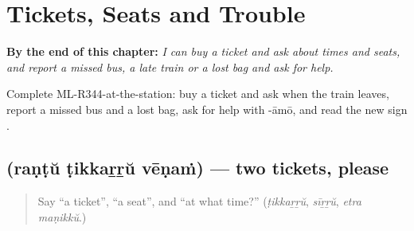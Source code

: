 
\chapter{Tickets, Seats and Trouble}
\label{ch:ml-tickets-seats-and-trouble}

\begin{chapteropening}
\textbf{By the end of this chapter:} \emph{I can buy a ticket and ask about times and seats, and report a missed bus, a late train or a lost bag and ask for help.}

Complete ML-R344-at-the-station: buy a ticket and ask when the train leaves, report a missed bus and a lost bag, ask for help with -āmō, and read the new sign .
\end{chapteropening}

\section[\texorpdfstring{\ml{രണ്ട്} \ml{ടിക്കറ്റ്} \ml{വേണം} (raṇṭŭ ṭikkaṟṟŭ vēṇaṁ)}{രണ്ട് ടിക്കറ്റ് വേണം (raṇṭŭ ṭikkaṟṟŭ vēṇaṁ)}]{   (raṇṭŭ ṭikkaṟṟŭ vēṇaṁ) — two tickets, please}

\label{lesson:ML-C344-ticket-venam}



\begin{quote}
Say \textquotedblleft{}a ticket\textquotedblright{}, \textquotedblleft{}a seat\textquotedblright{}, and \textquotedblleft{}at what time?\textquotedblright{} (\emph{ṭikkaṟṟŭ}, \emph{sīṟṟŭ}, \emph{etra maṇikkŭ}.)
\end{quote}

